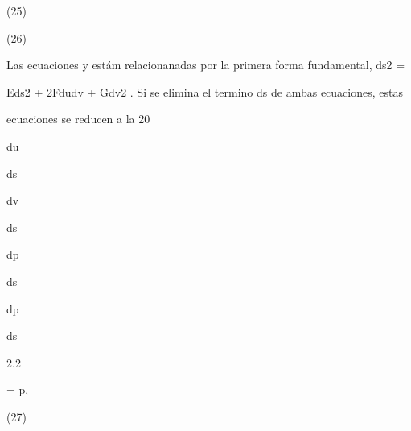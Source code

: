 \documentclass[a4paper,portrait,12pt]{article}
\begin{document}
(25)


(26)





\begin{flushleft}
Las ecuaciones y estám relacionanadas por la primera forma fundamental, ds2 =
\end{flushleft}


\begin{flushleft}
Eds2 + 2Fdudv + Gdv2 . Si se elimina el termino ds de ambas ecuaciones, estas
\end{flushleft}


\begin{flushleft}
ecuaciones se reducen a la 20
\end{flushleft}


\begin{flushleft}
du
\end{flushleft}


\begin{flushleft}
ds
\end{flushleft}


\begin{flushleft}
dv
\end{flushleft}


\begin{flushleft}
ds
\end{flushleft}


\begin{flushleft}
dp
\end{flushleft}


\begin{flushleft}
ds
\end{flushleft}


\begin{flushleft}
dp
\end{flushleft}


\begin{flushleft}
ds
\end{flushleft}





2.2





\begin{flushleft}
= p,
\end{flushleft}





(27)
\end{document}
